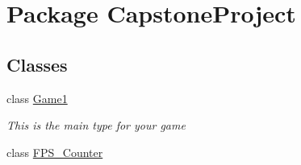 \hypertarget{namespace_capstone_project}{\section{Package Capstone\-Project}
\label{namespace_capstone_project}
}
\subsection*{Classes}
\begin{DoxyCompactItemize}
\item 
class \hyperlink{class_capstone_project_1_1_game1}{Game1}
\begin{DoxyCompactList}\small\item\em This is the main type for your game \end{DoxyCompactList}\item 
class \hyperlink{class_capstone_project_1_1_f_p_s___counter}{F\-P\-S\-\_\-\-Counter}
\end{DoxyCompactItemize}

